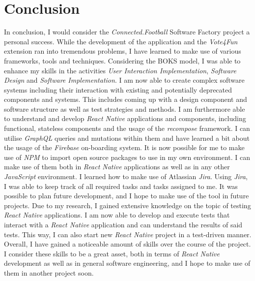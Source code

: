 \section{Conclusion}
\label{sec:Conclusion}

In conclusion, I would consider the \textit{Connected.Football} Software Factory project a personal success. While the development of the application and the \textit{Vote4Fun} extension ran into tremendous problems, I have learned to make use of various frameworks, tools and techniques.
\newline
Considering the BOKS model, I was able to enhance my skills in the activities \textit{User Interaction Implementation}, \textit{Software Design} and \textit{Software Implementation}. I am now able to create complex software systems including their interaction with existing and potentially deprecated components and systems. This includes coming up with a design component and software structure as well as test strategies and methods.
\newline
I am furthermore able to understand and develop \textit{React Native} applications and components, including functional, stateless components and the usage of the \textit{recompose} framework. I can utilise \textit{GraphQL} queries and mutations within them and have learned a bit about the usage of the \textit{Firebase} on-boarding system.
\newline
It is now possible for me to make use of \textit{NPM} to import open source packages to use in my own environment. I can make use of them both in \textit{React Native} applications as well as in any other \textit{JavaScript} environment.
\newline
I learned how to make use of Atlassian \textit{Jira}. Using \textit{Jira}, I was able to keep track of all required tasks and tasks assigned to me. It was possible to plan future development, and I hope to make use of the tool in future projects.
\newline
Due to my research, I gained extensive knowledge on the topic of testing \textit{React Native} applications. I am now able to develop and execute tests that interact with a \textit{React Native} application and can understand the results of said tests. This way, I can also start new \textit{React Native} project in a test-driven manner.
\newline
Overall, I have gained a noticeable amount of skills over the course of the project. I consider these skills to be a great asset, both in terms of \textit{React Native} development as well as in general software engineering, and I hope to make use of them in another project soon.